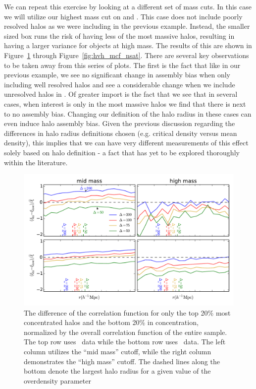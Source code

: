 \documentclass[usenatbib,usegraphicx,letterpaper]{mn2e}
\begin{document}
We can repeat this exercise by looking at a different set of mass cuts. In this case we will utilize our highest mass cut on \simB and \simC. This case does not include poorly resolved halos as we were including in the previous example. Instead, the smaller sized box runs the risk of having less of the most massive halos, resulting in having a larger variance for objects at high mass. The results of this are shown in Figure~\ref{fig:hvh_cfcompare} through Figure~\ref{fig:hvh_mcf_nsat}. There are several key observations to be taken away from this series of plots. The first is the fact that like in our previous example, we see no significant change in assembly bias when only including well resolved halos and see a considerable change when we include unresolved halos in \simC. Of greater import is the fact that we see that in several cases, when interest is only in the most massive halos we find that there is next to no assembly bias. Changing our definition of the halo radius in these cases can even induce halo assembly bias. Given the previous discussion regarding the differences in halo radius definitions chosen (e.g. critical density versus mean density), this implies that we can have very different measurements of this effect solely based on halo definition - a fact that has yet to be explored thoroughly within the literature.

\clearpage

\begin{figure}
	\centering
	\includegraphics[width=.9\textwidth]{all_cfhilow_z00_hostsvhigh.pdf}
	\caption{The difference of the correlation function for only the top 20\% most concentrated halos and the bottom 20\% in concentration, normalized by the overall correlation function of the entire sample. The top row uses \simB \ data while the bottom row uses \simC \ data. The left column utilizes the ``mid mass'' cutoff, while the right column demonstrates the ``high mass'' cutoff. The dashed lines along the bottom denote the largest halo radius for a given value of the overdensity parameter}
	\label{fig:hvh_cfcompare}
\end{figure}
\end{document}
